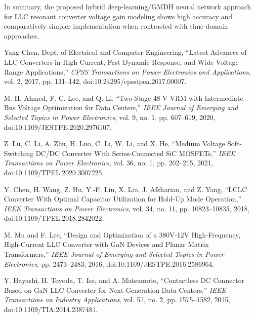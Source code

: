 \documentclass{article} %
\begin{document}
\par In summary, the proposed hybrid deep-learning/GMDH neural network approach for LLC resonant converter voltage gain modeling shows high accuracy and comparatively simpler implementation when contrasted with time-domain approaches. 

\vspace{1cm}

\begin{thebibliography}{99}

Yang Chen, Dept. of Electrical and Computer Engineering, 
``Latest Advances of LLC Converters in High Current, Fast Dynamic Response, and Wide Voltage Range Applications,''
\emph{CPSS Transactions on Power Electronics and Applications}, 
vol. 2, 2017, pp. 131--142, 
doi:10.24295/cpsstpea.2017.00007.

M. H. Ahmed, F. C. Lee, and Q. Li,
``Two-Stage 48-V VRM with Intermediate Bus Voltage Optimization for Data Centers,''
\emph{IEEE Journal of Emerging and Selected Topics in Power Electronics},
vol. 9, no. 1, pp. 607--619, 2020, 
doi:10.1109/JESTPE.2020.2976107.

Z. Lu, C. Li, A. Zhu, H. Luo, C. Li, W. Li, and X. He,
``Medium Voltage Soft-Switching DC/DC Converter With Series-Connected SiC MOSFETs,''
\emph{IEEE Transactions on Power Electronics},
vol. 36, no. 1, pp. 202--215, 2021,
doi:10.1109/TPEL.2020.3007225.

Y. Chen, H. Wang, Z. Hu, Y.-F. Liu, X. Liu, J. Afsharian, and Z. Yang,
``LCLC Converter With Optimal Capacitor Utilization for Hold-Up Mode Operation,''
\emph{IEEE Transactions on Power Electronics},
vol. 34, no. 11, pp. 10823--10835, 2018,
doi:10.1109/TPEL.2018.2842022.

M. Mu and F. Lee,
``Design and Optimization of a 380V-12V High-Frequency, High-Current LLC Converter with GaN Devices and Planar Matrix Transformers,''
\emph{IEEE Journal of Emerging and Selected Topics in Power Electronics},
pp. 2473--2483, 2016,
doi:10.1109/JESTPE.2016.2586964.

Y. Hayashi, H. Toyoda, T. Ise, and A. Matsumoto,
``Contactless DC Connector Based on GaN LLC Converter for Next-Generation Data Centers,''
\emph{IEEE Transactions on Industry Applications},
vol. 51, no. 2, pp. 1575--1582, 2015,
doi:10.1109/TIA.2014.2387481.


\end{thebibliography}
\end{document}
